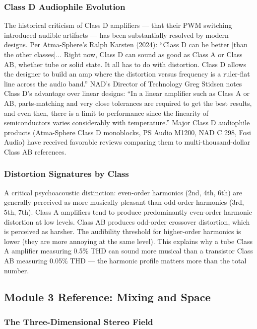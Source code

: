 \documentclass[11pt,letterpaper]{article}
\begin{document}
\subsubsection{Class D Audiophile Evolution}

The historical criticism of Class D amplifiers --- that their PWM switching introduced audible artifacts --- has been substantially resolved by modern designs. Per Atma-Sphere's Ralph Karsten (2024): ``Class D can be better [than the other classes]... Right now, Class D can sound as good as Class A or Class AB, whether tube or solid state. It all has to do with distortion. Class D allows the designer to build an amp where the distortion versus frequency is a ruler-flat line across the audio band.'' NAD's Director of Technology Greg Stidsen notes Class D's advantage over linear designs: ``In a linear amplifier such as Class A or AB, parts-matching and very close tolerances are required to get the best results, and even then, there is a limit to performance since the linearity of semiconductors varies considerably with temperature.'' Major Class D audiophile products (Atma-Sphere Class D monoblocks, PS Audio M1200, NAD C 298, Fosi Audio) have received favorable reviews comparing them to multi-thousand-dollar Class AB references.

\subsubsection{Distortion Signatures by Class}

A critical psychoacoustic distinction: even-order harmonics (2nd, 4th, 6th) are generally perceived as more musically pleasant than odd-order harmonics (3rd, 5th, 7th). Class A amplifiers tend to produce predominantly even-order harmonic distortion at low levels. Class AB produces odd-order crossover distortion, which is perceived as harsher. The audibility threshold for higher-order harmonics is lower (they are more annoying at the same level). This explains why a tube Class A amplifier measuring 0.5\% THD can sound more musical than a transistor Class AB measuring 0.05\% THD --- the harmonic profile matters more than the total number.

\subsection{Module 3 Reference: Mixing and Space}

\subsubsection{The Three-Dimensional Stereo Field}
\end{document}
